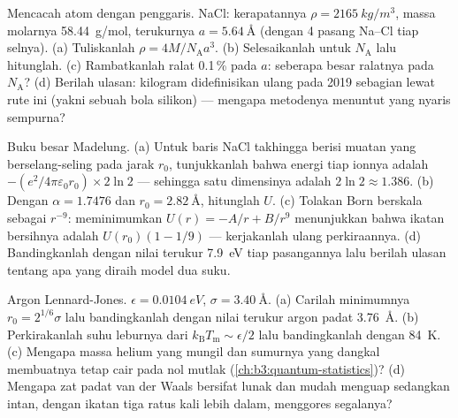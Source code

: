 \begin{exercise}[$\star\star$]\label{exo:b3:crystalline-solids:6}
Mencacah atom dengan penggaris. NaCl: kerapatannya
$\rho = \qty{2165}{kg/m^3}$, massa molarnya \qty{58.44}{g/mol},
 terukurnya $a = \qty{5.64}{\angstrom}$ (dengan 4 pasang
Na--Cl tiap selnya). (a) Tuliskanlah $\rho = 4M/N_{\text{A}}a^3$. (b)
Selesaikanlah untuk $N_{\text{A}}$ lalu hitunglah. (c) Rambatkanlah ralat
0.1\,\% pada $a$: seberapa besar ralatnya pada $N_{\text{A}}$? (d) Berilah
ulasan: kilogram didefinisikan ulang pada 2019 sebagian lewat rute 
ini (yakni sebuah bola silikon) --- mengapa metodenya menuntut 
yang nyaris sempurna?
\end{exercise}

\begin{exercise}[$\star\star$]\label{exo:b3:crystalline-solids:7}
Buku besar Madelung. (a) Untuk baris NaCl takhingga berisi muatan yang
berselang-seling pada jarak $r_0$, tunjukkanlah bahwa energi tiap ionnya adalah
$-(e^2/4\pi\varepsilon_0r_0)\times2\ln2$ --- sehingga
 satu dimensinya adalah $2\ln2 \approx 1.386$. (b)
Dengan $\alpha = 1.7476$ dan $r_0 = \qty{2.82}{\angstrom}$, hitunglah
$U$. (c) Tolakan Born berskala sebagai $r^{-9}$: meminimumkan
$U(r) = -A/r + B/r^9$ menunjukkan bahwa ikatan bersihnya adalah $U(r_0)(1 - 1/9)$
--- kerjakanlah ulang perkiraannya. (d) Bandingkanlah dengan nilai terukur
\qty{7.9}{eV} tiap pasangannya lalu berilah ulasan tentang apa yang diraih model dua suku.
\end{exercise}

\begin{exercise}[$\star\star$]\label{exo:b3:crystalline-solids:8}
Argon Lennard-Jones. $\epsilon = \qty{0.0104}{eV}$, $\sigma =
\qty{3.40}{\angstrom}$. (a) Carilah minimumnya $r_0 = 2^{1/6}
\sigma$ lalu bandingkanlah dengan nilai terukur argon padat
\qty{3.76}{\angstrom}. (b) Perkirakanlah suhu leburnya dari
$k_{\text{B}}T_{\text{m}} \sim \epsilon/2$ lalu bandingkanlah dengan
\qty{84}{K}. (c) Mengapa massa helium yang mungil dan sumurnya yang
dangkal membuatnya tetap cair pada nol mutlak (\cref{ch:b3:quantum-statistics})? (d)
Mengapa zat padat van der Waals bersifat lunak dan mudah menguap sedangkan intan,
dengan ikatan tiga ratus kali lebih dalam, menggores segalanya?
\end{exercise}

